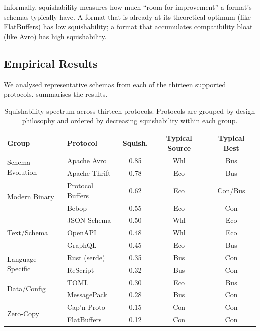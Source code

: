 \documentclass[11pt,a4paper]{article}
\theoremstyle{definition}
\theoremstyle{remark}
\newcommand{\conc}{\textsf{Con}}                 %
\newcommand{\busi}{\textsf{Bus}}                 %
\newcommand{\econ}{\textsf{Eco}}                 %
\newcommand{\wheel}{\textsf{Whl}}               %
\begin{document}
Informally, squishability measures how much ``room for improvement''
a format's schemas typically have. A format that is already at its
theoretical optimum (like FlatBuffers) has low squishability; a format
that accumulates compatibility bloat (like Avro) has high
squishability.

\subsection{Empirical Results}

We analysed representative schemas from each of the thirteen
supported protocols.  summarises the results.

\begin{table}[ht]
\centering
\caption{Squishability spectrum across thirteen protocols. Protocols
  are grouped by design philosophy and ordered by decreasing
  squishability within each group.}
\label{tab:squishability}
\begin{tabular}{@{}llccc@{}}
\toprule
\textbf{Group} & \textbf{Protocol} & \textbf{Squish.} &
  \textbf{Typical Source} & \textbf{Typical Best} \\
\midrule
\multirow{2}{*}{Schema Evolution}
  & Apache Avro   & 0.85 & \wheel & \busi \\
  & Apache Thrift & 0.78 & \econ  & \busi \\
\midrule
\multirow{2}{*}{Modern Binary}
  & Protocol Buffers & 0.62 & \econ & \conc/\busi \\
  & Bebop            & 0.55 & \econ & \conc \\
\midrule
\multirow{3}{*}{Text/Schema}
  & JSON Schema & 0.50 & \wheel & \econ \\
  & OpenAPI     & 0.48 & \wheel & \econ \\
  & GraphQL     & 0.45 & \econ  & \busi \\
\midrule
\multirow{2}{*}{Language-Specific}
  & Rust (serde) & 0.35 & \busi & \conc \\
  & ReScript     & 0.32 & \busi & \conc \\
\midrule
\multirow{2}{*}{Data/Config}
  & TOML        & 0.30 & \econ & \busi \\
  & MessagePack & 0.28 & \busi & \conc \\
\midrule
\multirow{2}{*}{Zero-Copy}
  & Cap'n Proto  & 0.15 & \conc & \conc \\
  & FlatBuffers  & 0.12 & \conc & \conc \\
\bottomrule
\end{tabular}
\end{table}
\end{document}
